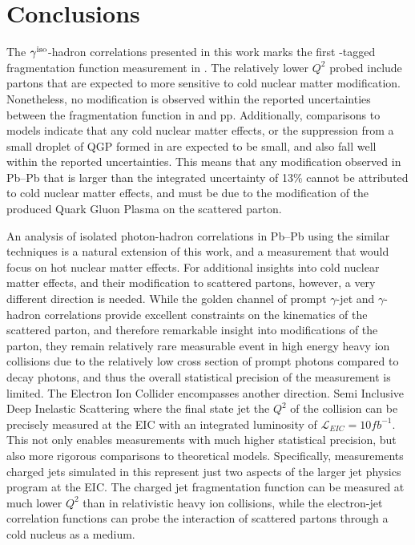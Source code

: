 







\chapter{Conclusions}

The $\gamma^\mathrm{iso}$-hadron correlations presented in this work marks the first \gammaiso-tagged fragmentation function measurement in \pPb. The relatively lower $Q^2$ probed include partons that are expected to more sensitive to cold nuclear matter modification. Nonetheless, no modification is observed within the reported uncertainties between the fragmentation function in \pPb and pp. Additionally, comparisons to models indicate that any cold nuclear matter effects, or the suppression from a small droplet of QGP formed in \pPb are expected to be small, and also fall well within the reported uncertainties. This means that any modification observed in Pb--Pb that is larger than the integrated uncertainty of 13\% cannot be attributed to cold nuclear matter effects, and must be due to the modification of the produced Quark Gluon Plasma on the scattered parton.

An analysis of isolated photon-hadron correlations in Pb--Pb using the similar techniques is a natural extension of this work, and a measurement that would focus on hot nuclear matter effects. For additional insights into cold nuclear matter effects, and their modification to scattered partons, however, a very different direction is needed. While the golden channel of prompt $\gamma$-jet and $\gamma$-hadron correlations provide excellent constraints on the kinematics of the scattered parton, and therefore remarkable insight into modifications of the parton, they remain relatively rare measurable event in high energy heavy ion collisions due to the relatively low cross section of prompt photons compared to decay photons, and thus the overall statistical precision of the measurement is limited. The Electron Ion Collider encompasses another direction. Semi Inclusive Deep Inelastic Scattering where the final state jet the $Q^2$ of the collision can be precisely measured at the EIC with an integrated luminosity of $\mathcal{L}_{EIC}=10fb^{-1}$. This not only enables measurements with much higher statistical precision, but also more rigorous comparisons to theoretical models. Specifically, measurements charged jets simulated in this represent just two aspects of the larger jet physics program at the EIC. The charged jet fragmentation function can be measured at much lower $Q^2$ than in relativistic heavy ion collisions, while the electron-jet correlation functions can probe the interaction of scattered partons through a cold nucleus as a medium. 

